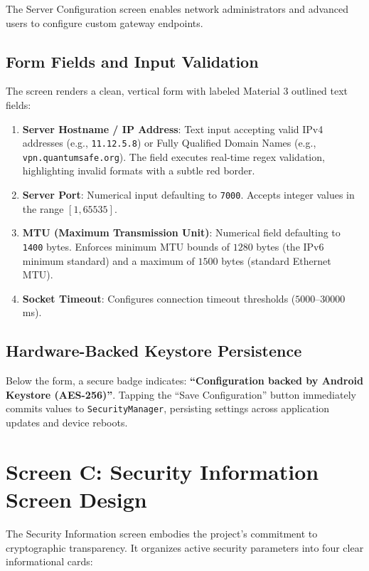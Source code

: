 The Server Configuration screen enables network administrators and advanced users to configure custom gateway endpoints.

\subsection{Form Fields and Input Validation}
The screen renders a clean, vertical form with labeled Material 3 outlined text fields:
\begin{enumerate}
    \item \textbf{Server Hostname / IP Address}: Text input accepting valid IPv4 addresses (e.g., \texttt{11.12.5.8}) or Fully Qualified Domain Names (e.g., \texttt{vpn.quantumsafe.org}). The field executes real-time regex validation, highlighting invalid formats with a subtle red border.
    \item \textbf{Server Port}: Numerical input defaulting to \texttt{7000}. Accepts integer values in the range $[1, 65535]$.
    \item \textbf{MTU (Maximum Transmission Unit)}: Numerical field defaulting to \texttt{1400} bytes. Enforces minimum MTU bounds of $1280$ bytes (the IPv6 minimum standard) and a maximum of $1500$ bytes (standard Ethernet MTU).
    \item \textbf{Socket Timeout}: Configures connection timeout thresholds ($5000$--$30000$\,ms).
\end{enumerate}

\subsection{Hardware-Backed Keystore Persistence}
Below the form, a secure badge indicates: \textbf{``Configuration backed by Android Keystore (AES-256)''}. Tapping the ``Save Configuration'' button immediately commits values to \texttt{SecurityManager}, persisting settings across application updates and device reboots.

\section{Screen C: Security Information Screen Design}
\label{sec:screen_security_details_design}

The Security Information screen embodies the project's commitment to cryptographic transparency. It organizes active security parameters into four clear informational cards:

